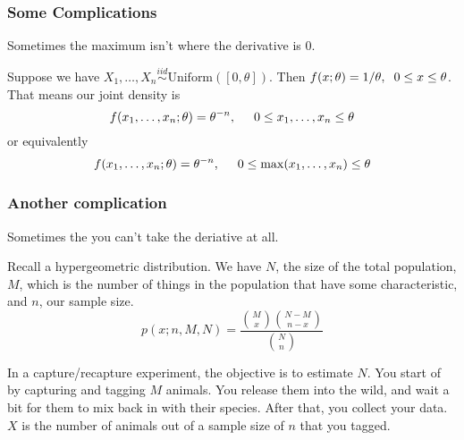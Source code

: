 \documentclass{beamer}
\begin{document}



\begin{frame}
\frametitle{Some Complications}

Sometimes the maximum isn't where the derivative is $0$. 
\newline

Suppose we have $X_1, \ldots, X_n \overset{iid}{\sim} \text{Uniform}([0,\theta])$. Then $f(x;\theta) = 1/\theta, \hspace{2mm} 0 \le x \le \theta$. That means our joint density is 
\[
f(x_1, \ldots, x_n; \theta) = \theta^{-n}, \hspace{5mm} 0 \le x_1, \ldots, x_n \le \theta
\]
or equivalently
\[
f(x_1, \ldots, x_n; \theta) = \theta^{-n}, \hspace{5mm} 0 \le \max(x_1, \ldots, x_n) \le \theta
\]

\end{frame}



\begin{frame}
\frametitle{Another complication}

Sometimes the you can't take the deriative at all.
\newline

Recall a hypergeometric distribution. We have $N$, the size of the total population, $M$, which is the number of things in the population that have some characteristic, and $n$, our sample size.
\[
p(x;n,M,N) = \frac{{M \choose x}{N-M \choose n-x } }{{N \choose n }}
\]

In a capture/recapture experiment, the objective is to estimate $N$. You start of by capturing and tagging $M$ animals. You release them into the wild, and wait a bit for them to mix back in with their species. After that, you collect your data. $X$ is the number of animals out of a sample size of $n$ that you tagged.

\end{frame}
\end{document}
